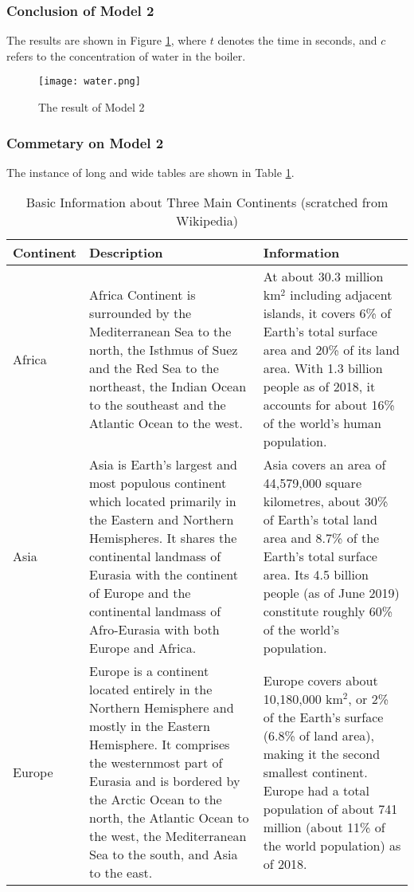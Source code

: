 \documentclass[12pt]{article}  %
\begin{document}
	\subsubsection{Conclusion of Model 2}
	The results are shown in Figure \ref{fig:result}, where $t$ denotes the time in seconds, and $c$ refers to the concentration of water in the boiler.
	
	\begin{figure}[htbp]
		\centering
		\texttt{[image: water.png]}
		\caption{The result of Model 2}\label{fig:result}
	\end{figure}
	
	\clearpage
	\subsubsection{Commetary on Model 2}
	The instance of long and wide tables are shown in Table \ref{tb:longtable}.
	
	\begin{longtable}{ p{4em} p{14em} p{14em} }
		\caption{Basic Information about Three Main Continents (scratched from Wikipedia)}
		\label{tb:longtable}\\
		\toprule
		Continent & Description & Information \\
		\midrule
		Africa & Africa Continent is surrounded by the Mediterranean Sea to the
		north, the Isthmus of Suez and the Red Sea to the northeast, the Indian
		Ocean to the southeast and the Atlantic Ocean to the west. &
		At about 30.3 million km$^2$ including adjacent islands, it covers 6\%
		of Earth's total surface area and 20\% of its land area. With 1.3
		billion people as of 2018, it accounts for about 16\% of the world's
		human population. \\
		\midrule
		Asia & Asia is Earth's largest and most populous continent which
		located primarily in the Eastern and Northern Hemispheres.
		It shares the continental landmass of Eurasia with the continent
		of Europe and the continental landmass of Afro-Eurasia with both
		Europe and Africa. &
		Asia covers an area of 44,579,000 square kilometres, about 30\%
		of Earth's total land area and 8.7\% of the Earth's total surface
		area. Its 4.5 billion people (as of June 2019) constitute roughly
		60\% of the world's population. \\
		\midrule
		Europe & Europe is a continent located entirely in the Northern
		Hemisphere and mostly in the Eastern Hemisphere. It comprises the
		westernmost part of Eurasia and is bordered by the Arctic Ocean to
		the north, the Atlantic Ocean to the west, the Mediterranean Sea to
		the south, and Asia to the east. &
		Europe covers about 10,180,000 km$^2$, or 2\% of the Earth's surface
		(6.8\% of land area), making it the second smallest
		continent. Europe had a total population of about 741 million (about
		11\% of the world population) as of 2018. \\
		\bottomrule
	\end{longtable}
	
\end{document}

